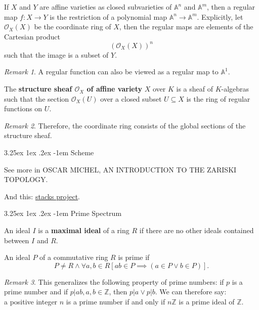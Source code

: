 \documentclass[12pt, letterpaper]{article}
\makeatletter
\renewcommand\subparagraph{\@startsection{subparagraph}{5}{\parindent}%
	{3.25ex \@plus1ex \@minus .2ex}%
	{0.75ex plus 0.1ex}%
	{\normalfont\normalsize\bfseries}}
\newcommand{\inte}{\mathbb{Z}}
\newcommand{\blue}[1]{{\color{blue} #1}}
\renewcommand\paragraph{\@startsection{paragraph}{4}{\z@}%
	{3.25ex \@plus1ex \@minus.2ex}%
	{-1em}%
	{\normalfont\normalsize\bfseries}}
\renewcommand\subparagraph{\@startsection{subparagraph}{5}{\parindent}%
	{3.25ex \@plus1ex \@minus .2ex}%
	{-1em}%
	{\normalfont\normalsize\bfseries}}
\theoremstyle{definition}
\theoremstyle{remark}
\newtheorem*{rem*}{Remark}
\theoremstyle{definition}
\theoremstyle{plain}
\numberwithin{equation}{section}
\makeatother
\begin{document}
	\begin{def*}
		If $X$ and $Y$ are affine varieties as closed subvarieties of
		${\mathbb  {A}}^{n}$ and ${\displaystyle \mathbb {A} ^{m}}$,
		then a regular map $f\colon X\to Y$ is the restriction of
		a polynomial map $\mathbb {A} ^{n}\to \mathbb {A} ^{m}$.
		Explicitly, let $\mathcal{O}_X(X)$ be the coordinate ring of $X$,
		then the regular maps are elements of the Cartesian product
		\[(\mathcal{O}_X(X))^n \]
		such that the image is a subset of $Y$.
	\end{def*}
	\begin{rem*}
		A regular function can also be viewed as a regular map to $\mathbb{A}^1$.
	\end{rem*}

	\begin{def*}
		The \textbf{structure sheaf ${\mathcal {O}}_{X}$ of affine variety} $X$ over $K$ is a sheaf of $K$-algebras
		such that the section ${\mathcal {O}}_{X}(U)$ over a closed subset $U\subseteq X$ is the ring of regular functions on $U$.
	\end{def*}
	\begin{rem*}
		Therefore, the coordinate ring consists of the global sections of the structure sheaf.
	\end{rem*}
	
	\paragraph{Scheme}
	
	See more in \blue{OSCAR MICHEL, AN INTRODUCTION TO THE ZARISKI TOPOLOGY.}
	
	\blue{And this: }\href{https://stacks.math.columbia.edu/tag/00DY}{stacks project}.
	
	\subparagraph{Prime Spectrum}
	
	
	\begin{def*}
		An ideal $I$ is a \textbf{maximal ideal} of a ring $R$ if there are no other ideals contained between $I$ and $R$.
	\end{def*}

	\begin{def*}
		An ideal $P$ of a commutative ring $R$ is prime if 
		\[ P\ne R \land \forall a,b \in R[ab\in P\implies(a\in P\lor b\in P)]. \]
	\end{def*}
	\begin{rem*}
		This generalizes the following property of prime numbers: if $p$ is a prime number and if $p|ab, a,b\in\inte$, then $p|a\lor p|b$. We can therefore say:\\
		a positive integer $n$ is a prime number if and only if $ n\inte$ is a prime ideal of $\inte$.
	\end{rem*}
\end{document}
